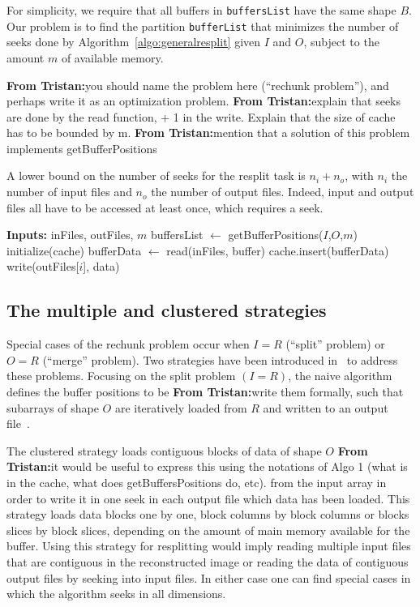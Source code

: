 \documentclass[conference]{IEEEtran}
\newcommand{\tristan}[1]{\color{orange}\textbf{From Tristan:}#1\color{black}}
\begin{document}
For simplicity, we require that all buffers in \texttt{buffersList} have
the same shape $B$. Our problem is to find the partition \texttt{bufferList}
that minimizes the number of seeks done by Algorithm~\ref{algo:generalresplit}
given $I$ and $O$, subject to the amount $m$ of available memory.

\tristan{you should name the problem here (``rechunk problem''), and perhaps write it as an optimization problem.}
\tristan{explain that seeks are done by the read function, + 1 in the write. Explain that the size of cache has to be bounded by m.}
\tristan{mention that a solution of this problem implements getBufferPositions}

A lower bound on the number of seeks for the resplit task is $n_i + n_o$,
with $n_i$ the number of input files and $n_o$ the number of output files.
Indeed, input and output files all have to be accessed at least once, which
requires a seek.

\begin{algorithm}
  \caption{General resplit \tristan{Use resplit or rechunk consistently} algorithm}
  \label{algo:generalresplit}
  \begin{algorithmic}
    \STATE \textbf{Inputs:} inFiles, outFiles, $m$
    \STATE buffersList $\leftarrow$ getBufferPositions($I$,$O$,$m$)
    \STATE initialize(cache)
      \STATE bufferData $\leftarrow$ read(inFiles, buffer)
      \STATE cache.insert(bufferData)
        \STATE write(outFiles[$i$], data)
      \ENDFOR
    \ENDFOR

  \end{algorithmic}
\end{algorithm}

\subsection{The multiple and clustered strategies}
Special cases of the rechunk problem occur when $I=R$ (``split'' problem)
or $O=R$ (``merge'' problem). Two strategies have been introduced
in~\cite{seqalgorithms} to address these problems. Focusing on the split
problem $(I=R)$, the naive algorithm defines the buffer positions to be
\tristan{write them formally}, such that subarrays of shape $O$ are
iteratively loaded from $R$ and written to an output
file~\cite{seqalgorithms}.

The clustered strategy loads contiguous blocks of data of shape $O$ \tristan{it would be useful to express this using the notations of Algo 1 (what is in the cache, what does getBuffersPositions do, etc).}
from the input array in order to write it in one seek in each output file which
data has been loaded. This strategy loads data blocks one by one, block columns
by block columns or blocks slices by block slices, depending on the amount of
main memory available for the buffer. Using this strategy for resplitting would
imply reading multiple input files that are contiguous in the reconstructed
image or reading the data of contiguous output files by seeking into input files.
In either case one can find special cases in which the algorithm seeks in all
dimensions.
\end{document}
